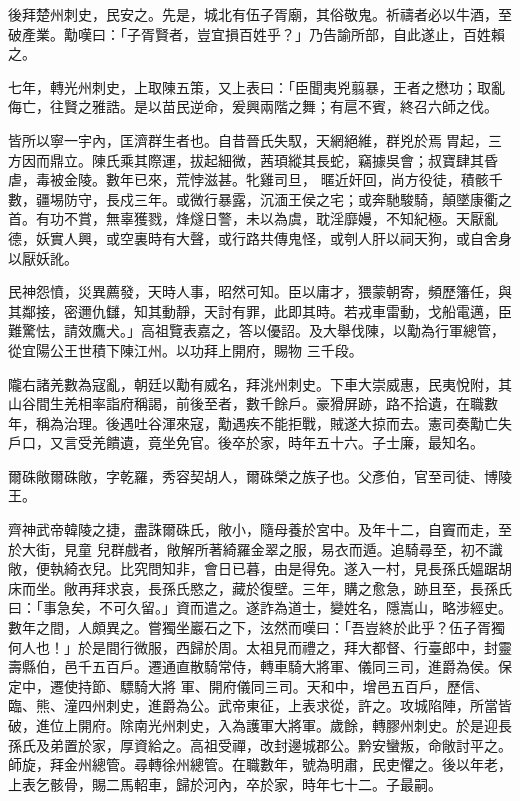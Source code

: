 \begin{pinyinscope}
 後拜楚州刺史，民安之。先是，城北有伍子胥廟，其俗敬鬼。祈禱者必以牛酒，至破產業。勱嘆曰：「子胥賢者，豈宜損百姓乎？」乃告諭所部，自此遂止，百姓賴之。



 七年，轉光州刺史，上取陳五策，又上表曰：「臣聞夷兇翦暴，王者之懋功；取亂侮亡，往賢之雅誥。是以苗民逆命，爰興兩階之舞；有扈不賓，終召六師之伐。



 皆所以寧一宇內，匡濟群生者也。自昔晉氏失馭，天網絕維，群兇於焉胃起，三方因而鼎立。陳氏乘其際運，拔起細微，茜頊縱其長蛇，竊據吳會；叔寶肆其昏虐，毒被金陵。數年已來，荒悖滋甚。牝雞司旦，
 暱近奸回，尚方役徒，積骸千數，疆埸防守，長戍三年。或微行暴露，沉湎王侯之宅；或奔馳駿騎，顛墜康衢之首。有功不賞，無辜獲戮，烽燧日警，未以為虞，耽淫靡嫚，不知紀極。天厭亂德，妖實人興，或空裏時有大聲，或行路共傳鬼怪，或刳人肝以祠天狗，或自舍身以厭妖訛。



 民神怨憤，災異薦發，天時人事，昭然可知。臣以庸才，猥蒙朝寄，頻歷籓任，與其鄰接，密邇仇讎，知其動靜，天討有罪，此即其時。若戎車雷動，戈船電邁，臣難驚怯，請效鷹犬。」高祖覽表嘉之，答以優詔。及大舉伐陳，以勱為行軍總管，從宜陽公王世積下陳江州。以功拜上開府，賜物
 三千段。



 隴右諸羌數為寇亂，朝廷以勱有威名，拜洮州刺史。下車大崇威惠，民夷悅附，其山谷間生羌相率詣府稱謁，前後至者，數千餘戶。豪猾屏跡，路不拾遺，在職數年，稱為治理。後遇吐谷渾來寇，勱遇疾不能拒戰，賊遂大掠而去。憲司奏勱亡失戶口，又言受羌饋遺，竟坐免官。後卒於家，時年五十六。子士廉，最知名。



 爾硃敞爾硃敞，字乾羅，秀容契胡人，爾硃榮之族子也。父彥伯，官至司徒、博陵王。



 齊神武帝韓陵之捷，盡誅爾硃氏，敞小，隨母養於宮中。及年十二，自竇而走，至於大街，見童
 兒群戲者，敞解所著綺羅金翠之服，易衣而遁。追騎尋至，初不識敞，便執綺衣兒。比究問知非，會日已暮，由是得免。遂入一村，見長孫氏媼踞胡床而坐。敞再拜求哀，長孫氏愍之，藏於復壁。三年，購之愈急，跡且至，長孫氏曰：「事急矣，不可久留。」資而遣之。遂詐為道士，變姓名，隱嵩山，略涉經史。數年之間，人頗異之。嘗獨坐巖石之下，泫然而嘆曰：「吾豈終於此乎？伍子胥獨何人也！」於是間行微服，西歸於周。太祖見而禮之，拜大都督、行臺郎中，封靈壽縣伯，邑千五百戶。遷通直散騎常侍，轉車騎大將軍、儀同三司，進爵為侯。保定中，遷使持節、驃騎大將
 軍、開府儀同三司。天和中，增邑五百戶，歷信、臨、熊、潼四州刺史，進爵為公。武帝東征，上表求從，許之。攻城陷陣，所當皆破，進位上開府。除南光州刺史，入為護軍大將軍。歲餘，轉膠州刺史。於是迎長孫氏及弟置於家，厚資給之。高祖受禪，改封邊城郡公。黔安蠻叛，命敞討平之。師旋，拜金州總管。尋轉徐州總管。在職數年，號為明肅，民吏懼之。後以年老，上表乞骸骨，賜二馬軺車，歸於河內，卒於家，時年七十二。子最嗣。




\end{pinyinscope}
